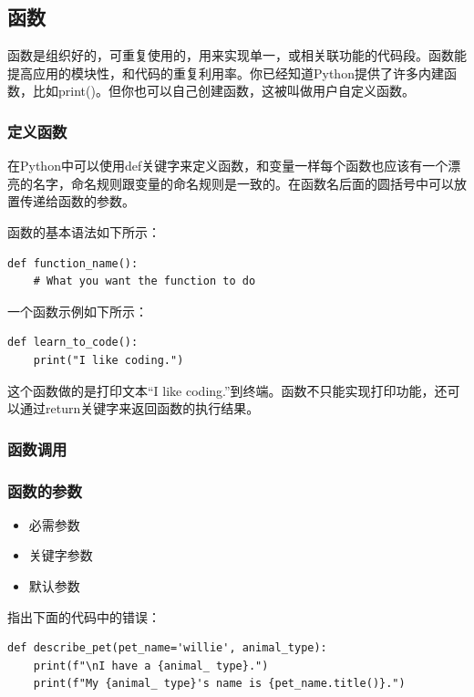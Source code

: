\documentclass[10pt]{elegantnote}
\begin{document}
\begin{sloppypar}
\subsection{函数}

函数是组织好的，可重复使用的，用来实现单一，或相关联功能的代码段。函数能提高应用的模块性，和代码的重复利用率。你已经知道Python提供了许多内建函数，比如print()。但你也可以自己创建函数，这被叫做用户自定义函数。

\subsubsection{定义函数}

在Python中可以使用def关键字来定义函数，和变量一样每个函数也应该有一个漂亮的名字，命名规则跟变量的命名规则是一致的。在函数名后面的圆括号中可以放置传递给函数的参数。

函数的基本语法如下所示：

\begin{lstlisting}
def function_name():
    # What you want the function to do
\end{lstlisting}

一个函数示例如下所示：
\begin{lstlisting}
def learn_to_code():
    print("I like coding.")
\end{lstlisting}

这个函数做的是打印文本“I like coding.”到终端。函数不只能实现打印功能，还可以通过return关键字来返回函数的执行结果。

\subsubsection{函数调用}

\subsubsection{函数的参数}
    \begin{itemize}
      \item 必需参数
      \item 关键字参数
      \item 默认参数
    \end{itemize}

指出下面的代码中的错误：
\begin{lstlisting}
def describe_pet(pet_name='willie', animal_type):
    print(f"\nI have a {animal_ type}.")
    print(f"My {animal_ type}'s name is {pet_name.title()}.")


\end{lstlisting}
\end{sloppypar}
\end{document}
